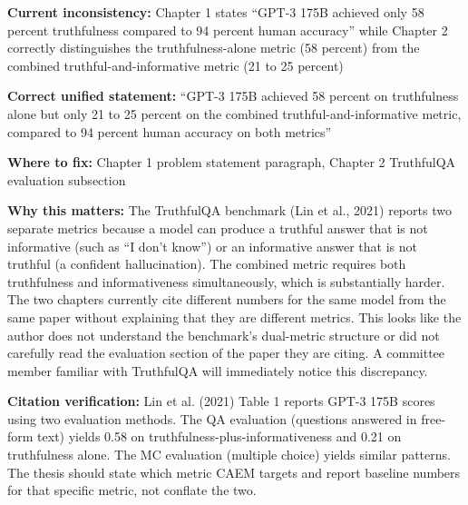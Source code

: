 \documentclass[11pt,a4paper]{article}
\newcommand{\criticalbox}[2]{%
\begin{tcolorbox}[enhanced,breakable,
  colback=LightCrimson,colframe=Crimson,boxrule=1.5pt,arc=4pt,
  left=8pt,right=8pt,top=6pt,bottom=6pt,
  title={\bfseries\small\color{white}#1},
  attach boxed title to top left={yshift=-2mm,xshift=6mm},
  boxed title style={colback=Crimson,arc=3pt,boxrule=0pt,
    left=4pt,right=4pt,top=2pt,bottom=2pt}]
#2
\end{tcolorbox}}
\begin{document}
\criticalbox{CORRECTION 2: TruthfulQA Numbers Inconsistency}{
\textbf{Current inconsistency:} Chapter 1 states ``GPT-3 175B achieved only 58 percent truthfulness compared to 94 percent human accuracy'' while Chapter 2 correctly distinguishes the truthfulness-alone metric (58 percent) from the combined truthful-and-informative metric (21 to 25 percent)

\textbf{Correct unified statement:} ``GPT-3 175B achieved 58 percent on truthfulness alone but only 21 to 25 percent on the combined truthful-and-informative metric, compared to 94 percent human accuracy on both metrics''

\textbf{Where to fix:} Chapter 1 problem statement paragraph, Chapter 2 TruthfulQA evaluation subsection

\textbf{Why this matters:} The TruthfulQA benchmark (Lin et al., 2021) reports two separate metrics because a model can produce a truthful answer that is not informative (such as ``I don't know'') or an informative answer that is not truthful (a confident hallucination). The combined metric requires both truthfulness and informativeness simultaneously, which is substantially harder. The two chapters currently cite different numbers for the same model from the same paper without explaining that they are different metrics. This looks like the author does not understand the benchmark's dual-metric structure or did not carefully read the evaluation section of the paper they are citing. A committee member familiar with TruthfulQA will immediately notice this discrepancy.

\textbf{Citation verification:} Lin et al. (2021) Table 1 reports GPT-3 175B scores using two evaluation methods. The QA evaluation (questions answered in free-form text) yields 0.58 on truthfulness-plus-informativeness and 0.21 on truthfulness alone. The MC evaluation (multiple choice) yields similar patterns. The thesis should state which metric CAEM targets and report baseline numbers for that specific metric, not conflate the two.
}
\end{document}
